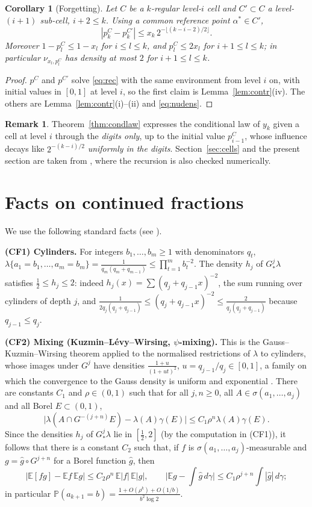 \documentclass[11pt]{amsart}
\newtheorem{corollary}[theorem]{Corollary}
\theoremstyle{definition}
\newtheorem{remark}[theorem]{Remark}
\numberwithin{equation}{section}
\newcommand{\E}{\mathbb{E}}
\newcommand{\Prob}{\mathbb{P}}
\begin{document}
\begin{corollary}[Forgetting]\label{cor:forget}
Let $C$ be a $k$-regular level-$i$ cell and $C'\subset C$ a level-$(i+1)$ sub-cell, $i+2\le k$. Using a common reference point
$\alpha^*\in C'$,
\[
|p^C_k-p^{C'}_k|\le x_k\,2^{-\lfloor(k-i-2)/2\rfloor}.
\]
Moreover $1-p^C_l\le1-x_l$ for $i\le l\le k$, and $p^C_l\le2x_l$ for $i+1\le l\le k$; in particular $\nu_{x_l,p^C_l}$ has density at most $2$ for
$i+1\le l\le k$.
\end{corollary}

\begin{proof}
$p^C$ and $p^{C'}$ solve \eqref{eq:rec} with the same environment from level $i$ on, with initial values in $[0,1]$ at level $i$, so the first claim is
Lemma~\ref{lem:contr}(iv). The others are Lemma~\ref{lem:contr}(i)--(ii) and \eqref{eq:nudens}.
\end{proof}

\begin{remark}
Theorem~\ref{thm:condlaw} expresses the conditional law of $y_k$ given a cell at level $i$ through the \emph{digits only}, up to the
initial value $p_{i-1}^C$, whose influence decays like $2^{-(k-i)/2}$ \emph{uniformly in the digits}. Section~\ref{sec:cells} and the
present section are taken from \cite{E1002}, where the recursion is also checked numerically.
\end{remark}
\section{Facts on continued fractions}\label{sec:cf}

We use the following standard facts (see \cite{Kh64,IK02}).

\smallskip\noindent\textbf{(CF1) Cylinders.} For integers $b_1,\dots,b_m\ge1$ with denominators $q_t$,
$\lambda\{a_1=b_1,\dots,a_m=b_m\}=\frac{1}{q_m(q_m+q_{m-1})}\le\prod_{t=1}^mb_t^{-2}$. The density $h_j$ of $G^j_*\lambda$ satisfies
$\frac12\le h_j\le2$: indeed $h_j(x)=\sum(q_j+q_{j-1}x)^{-2}$, the sum running over cylinders of depth $j$, and
$\frac{1}{2q_j(q_j+q_{j-1})}\le(q_j+q_{j-1}x)^{-2}\le\frac{2}{q_j(q_j+q_{j-1})}$ because $q_{j-1}\le q_j$.

\smallskip\noindent\textbf{(CF2) Mixing (Kuzmin--L\'evy--Wirsing, $\psi$-mixing).} This is the Gauss--Kuzmin--Wirsing theorem applied to the
normalised restrictions of $\lambda$ to cylinders, whose images under $G^j$ have densities $\frac{1+u}{(1+ut)^2}$, $u=q_{j-1}/q_j\in[0,1]$, a
family on which the convergence to the Gauss density is uniform and exponential \cite[Ch.~2]{IK02}. There are constants $C_1$ and $\rho\in(0,1)$
such that for all $j,n\ge0$, all $A\in\sigma(a_1,\dots,a_j)$ and all Borel $E\subset(0,1)$,
\[
\big|\lambda(A\cap G^{-(j+n)}E)-\lambda(A)\gamma(E)\big|\le C_1\rho^n\lambda(A)\gamma(E).
\]
Since the densities $h_j$ of $G^j_*\lambda$ lie in $[\frac12,2]$ (by the computation in (CF1)), it follows that there is a constant
$C_2$ such that, if $f$ is $\sigma(a_1,\dots,a_j)$-measurable and $g=\hat g\circ G^{j+n}$ for a Borel function $\hat g$, then
\[
|\E[fg]-\E f\,\E g|\le C_2\rho^n\,\E|f|\,\E|g|,\qquad \Big|\E g-\int\hat g\,d\gamma\Big|\le C_1\rho^{j+n}\int|\hat g|\,d\gamma ;
\]
in particular $\Prob(a_{k+1}=b)=\frac{1+O(\rho^k)+O(1/b)}{b^2\log2}$.
\end{document}
